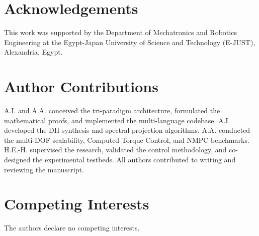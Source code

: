 \documentclass[fleqn,10pt]{article}
\begin{document}
	
	
	
	\section*{Acknowledgements}
	This work was supported by the Department of Mechatronics and Robotics Engineering at the Egypt-Japan University of Science and Technology (E-JUST), Alexandria, Egypt.
	
	\section*{Author Contributions}
	A.I. and A.A. conceived the tri-paradigm architecture, formulated the mathematical proofs, and implemented the multi-language codebase. A.I. developed the DH synthesis and spectral projection algorithms. A.A. conducted the multi-DOF scalability, Computed Torque Control, and NMPC benchmarks. H.E.-H. supervised the research, validated the control methodology, and co-designed the experimental testbeds. All authors contributed to writing and reviewing the manuscript.
	
	\section*{Competing Interests}
	The authors declare no competing interests.
	
\end{document}

